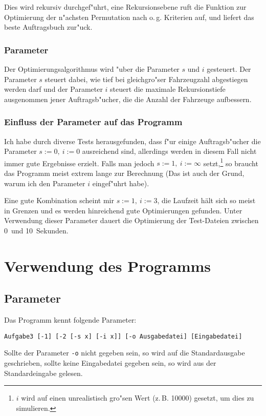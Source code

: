 \documentclass{scrreprt}
\begin{document}
Dies wird rekursiv durchgef"uhrt, eine Rekursionsebene ruft die Funktion zur
Optimierung der n"achsten Permutation nach o.\,g. Kriterien auf, und liefert das
beste Auftragsbuch zur"uck.

\subsection{Parameter}
Der Optimierungsalgorithmus wird "uber die Parameter $s$ und $i$ gesteuert. Der
Parameter $s$ steuert dabei, wie tief bei gleichgro"ser Fahrzeugzahl abgestiegen
werden darf und der Parameter $i$ steuert die maximale Rekursionstiefe
ausgenommen jener Auftragsb"ucher, die die Anzahl der Fahrzeuge aufbessern.

\subsection{Einfluss der Parameter auf das Programm}
Ich habe durch diverse Tests herausgefunden, dass f"ur einige Auftragsb"ucher
die Parameter $s := 0,\ i := 0$ ausreichend sind, allerdings werden in diesem
Fall nicht immer gute Ergebnisse erzielt.  Falls man jedoch $s := 1,\ i :=
\infty$ setzt,\footnote{$i$ wird auf einen unrealistisch gro"sen Wert (z.\,B.
10000) gesetzt, um dies zu simulieren.} so braucht das Programm meist extrem
lange zur Berechnung (Das ist auch der Grund, warum ich den Parameter $i$
eingef"uhrt habe).

Eine gute Kombination scheint mir $s := 1,\ i := 3$, die Laufzeit hält sich so
meist in Grenzen und es werden hinreichend gute Optimierungen gefunden.  Unter
Verwendung dieser Parameter dauert die Optimierung der Test-Dateien zwischen 0\ 
und 10\ Sekunden.

\chapter{Verwendung des Programms}

\section{Parameter}
Das Programm kennt folgende Parameter:

\begin{verbatim}
Aufgabe3 [-1] [-2 [-s x] [-i x]] [-o Ausgabedatei] [Eingabedatei]
\end{verbatim}

Sollte der Parameter \texttt{-o} nicht gegeben sein, so wird auf die
Standardausgabe geschrieben, sollte keine Eingabedatei gegeben sein, so wird aus
der Standardeingabe gelesen.
\end{document}
